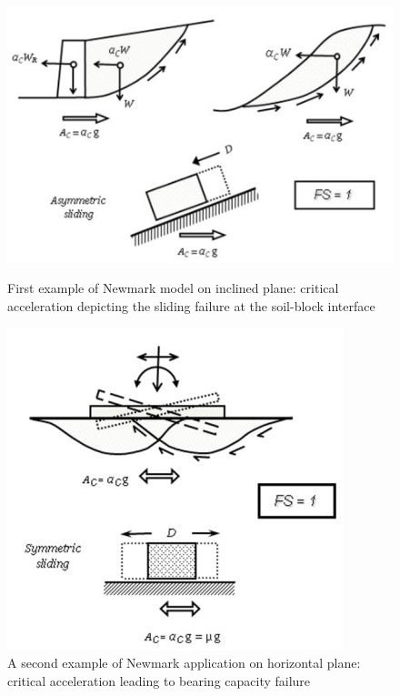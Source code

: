 \documentclass[12pt,a4paper]{report}
\begin{document}
 \begin{figure}[!h]
 	\centering
 	\begin{minipage}[b]{0.45\textwidth}
 		\includegraphics[width=\textwidth]{newmark1}
 		\caption{First example of Newmark model on inclined plane: critical acceleration depicting the sliding failure at the soil-block interface}
 		\label{newmark1}
 	\end{minipage}
 	\hfill
 	\begin{minipage}[b]{0.45\textwidth}
 		\includegraphics[width=\textwidth]{newmark2}
 		\caption{A second example of Newmark application on horizontal plane: critical acceleration leading to bearing capacity failure}
 		\label{newmark2}
 	\end{minipage}
 \end{figure}
 
\end{document}
